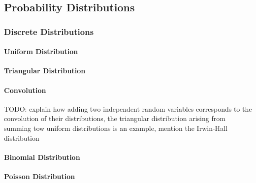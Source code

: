 


\subsection{Probability Distributions}


\subsubsection{Discrete Distributions}

\paragraph{Uniform Distribution}

\paragraph{Triangular Distribution}

\paragraph{Convolution} TODO: explain how adding two independent random variables corresponds to the convolution of their distributions, the triangular distribution arising from summing tow uniform distributions is an example, mention the Irwin-Hall distribution



\paragraph{Binomial Distribution}

\paragraph{Poisson Distribution}


